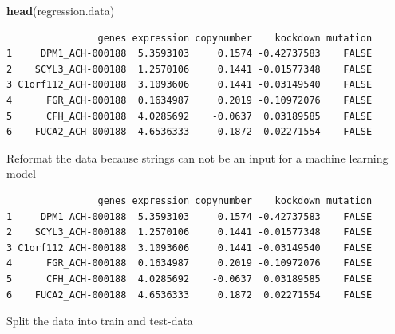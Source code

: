 \documentclass[]{article}
\newenvironment{Shaded}{\begin{snugshade}}{\end{snugshade}}
\newcommand{\KeywordTok}[1]{\textcolor[rgb]{0.13,0.29,0.53}{\textbf{#1}}}
\newcommand{\DataTypeTok}[1]{\textcolor[rgb]{0.13,0.29,0.53}{#1}}
\newcommand{\StringTok}[1]{\textcolor[rgb]{0.31,0.60,0.02}{#1}}
\newcommand{\OperatorTok}[1]{\textcolor[rgb]{0.81,0.36,0.00}{\textbf{#1}}}
\newcommand{\NormalTok}[1]{#1}
\begin{document}
\begin{Shaded}
\begin{Highlighting}[]
\KeywordTok{head}\NormalTok{(regression.data)}
\end{Highlighting}
\end{Shaded}

\begin{verbatim}
                genes expression copynumber    kockdown mutation
1     DPM1_ACH-000188  5.3593103     0.1574 -0.42737583    FALSE
2    SCYL3_ACH-000188  1.2570106     0.1441 -0.01577348    FALSE
3 C1orf112_ACH-000188  3.1093606     0.1441 -0.03149540    FALSE
4      FGR_ACH-000188  0.1634987     0.2019 -0.10972076    FALSE
5      CFH_ACH-000188  4.0285692    -0.0637  0.03189585    FALSE
6    FUCA2_ACH-000188  4.6536333     0.1872  0.02271554    FALSE
\end{verbatim}

Reformat the data because strings can not be an input for a machine
learning model

\begin{Shaded}
\end{Shaded}

\begin{verbatim}
                genes expression copynumber    kockdown mutation
1     DPM1_ACH-000188  5.3593103     0.1574 -0.42737583    FALSE
2    SCYL3_ACH-000188  1.2570106     0.1441 -0.01577348    FALSE
3 C1orf112_ACH-000188  3.1093606     0.1441 -0.03149540    FALSE
4      FGR_ACH-000188  0.1634987     0.2019 -0.10972076    FALSE
5      CFH_ACH-000188  4.0285692    -0.0637  0.03189585    FALSE
6    FUCA2_ACH-000188  4.6536333     0.1872  0.02271554    FALSE
\end{verbatim}

Split the data into train and test-data
\end{document}
